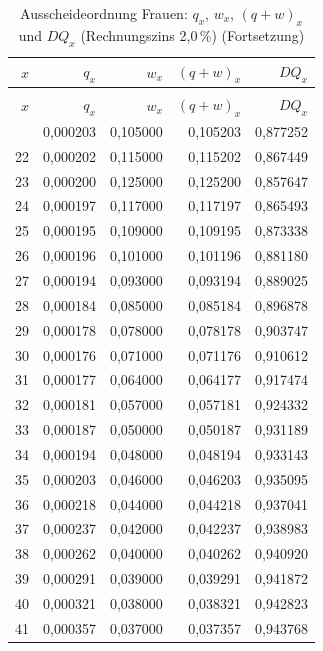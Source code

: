 \begin{small}
\begin{longtable}{rrrrr}
\caption{Ausscheideordnung Frauen: $q_x$, $w_x$, $(q+w)_x$ und $DQ_x$ (Rechnungszins 2,0\,\%)}\label{tab:aoF}\\
\toprule
$x$ & $q_x$ & $w_x$ & $(q+w)_x$ & $DQ_x$ \\
\midrule
\endfirsthead
\caption[]{Ausscheideordnung Frauen: $q_x$, $w_x$, $(q+w)_x$ und $DQ_x$ (Rechnungszins 2,0\,\%) (Fortsetzung)}\\
\toprule
$x$ & $q_x$ & $w_x$ & $(q+w)_x$ & $DQ_x$ \\
\midrule
\endhead
\bottomrule
\endfoot
21 & 0,000203 & 0,105000 & 0,105203 & 0,877252 \\
22 & 0,000202 & 0,115000 & 0,115202 & 0,867449 \\
23 & 0,000200 & 0,125000 & 0,125200 & 0,857647 \\
24 & 0,000197 & 0,117000 & 0,117197 & 0,865493 \\
25 & 0,000195 & 0,109000 & 0,109195 & 0,873338 \\
26 & 0,000196 & 0,101000 & 0,101196 & 0,881180 \\
27 & 0,000194 & 0,093000 & 0,093194 & 0,889025 \\
28 & 0,000184 & 0,085000 & 0,085184 & 0,896878 \\
29 & 0,000178 & 0,078000 & 0,078178 & 0,903747 \\
30 & 0,000176 & 0,071000 & 0,071176 & 0,910612 \\
31 & 0,000177 & 0,064000 & 0,064177 & 0,917474 \\
32 & 0,000181 & 0,057000 & 0,057181 & 0,924332 \\
33 & 0,000187 & 0,050000 & 0,050187 & 0,931189 \\
34 & 0,000194 & 0,048000 & 0,048194 & 0,933143 \\
35 & 0,000203 & 0,046000 & 0,046203 & 0,935095 \\
36 & 0,000218 & 0,044000 & 0,044218 & 0,937041 \\
37 & 0,000237 & 0,042000 & 0,042237 & 0,938983 \\
38 & 0,000262 & 0,040000 & 0,040262 & 0,940920 \\
39 & 0,000291 & 0,039000 & 0,039291 & 0,941872 \\
40 & 0,000321 & 0,038000 & 0,038321 & 0,942823 \\
41 & 0,000357 & 0,037000 & 0,037357 & 0,943768 \\

\end{longtable}
\end{small}
